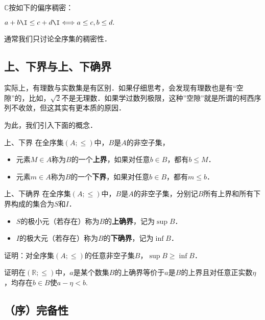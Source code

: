 \begin{example}{}
$\mathbb{C}$按如下的偏序稠密：

$a+b\I\leq c+d\I\Longleftrightarrow a\leq c,b\leq d.$

通常我们只讨论全序集的稠密性．
\end{example}

\subsection{上、下界与上、下确界}

实际上，有理数与实数集是有区别．如果仔细思考，会发现有理数也是有“空隙”的，比如，$\sqrt{2}$不是无理数．如果学过数列极限，这种”空隙”就是所谓的柯西序列不收敛，但这其实有更本质的原因．

为此，我们引入下面的概念．

\begin{definition}{上、下界}
在全序集$(A;\leq)$中，$B$是$A$的非空子集，
\begin{itemize}
\item 元素$M\in A$称为$B$的一个\textbf{上界}，如果对任意$b\in B$，都有$b\leq M$．
\item 元素$m\in A$称为$B$的一个\textbf{下界}，如果对任意$b\in B$，都有$m\leq b$．
\end{itemize}
\end{definition}

\begin{definition}{上、下确界}
在全序集$(A;\leq)$中，$B$是$A$的非空子集，分别记$B$所有上界和所有下界构成的集合为$S$和$I$．
\begin{itemize}
\item $S$的极小元（若存在）称为$B$的\textbf{上确界}，记为$\sup B$．
\item $I$的极大元（若存在）称为$B$的\textbf{下确界}，记为$\inf B$．
\end{itemize}
\end{definition}
\begin{exercise}{}
证明：对全序集$(A;\leq)$的任意非空子集$B$，$\sup B\geq\inf B$．
\end{exercise}
\begin{exercise}{}
证明在$(\mathbb{R};\leq)$中，$a$是某个数集$B$的上确界等价于$a$是$B$的上界且对任意正实数$\eta$，均存在$b\in B$使$a-\eta<b$.
\end{exercise}
\subsection{（序）完备性}

